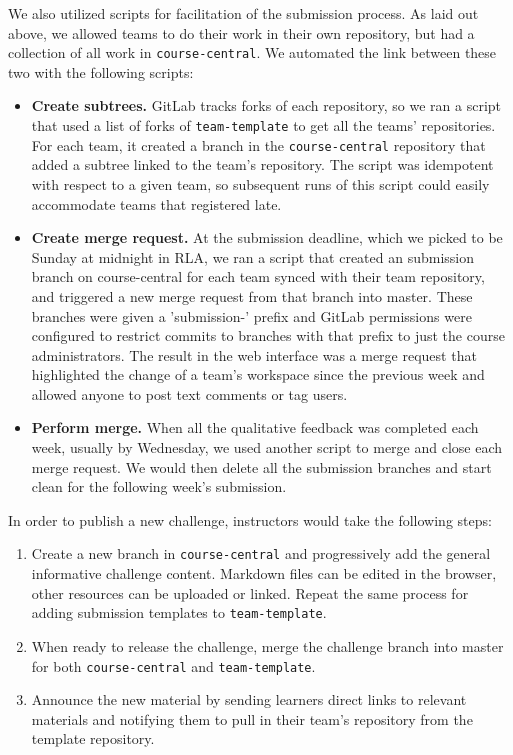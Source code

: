 \documentclass[12pt,twoside]{mitthesis}
\begin{document}
{We also utilized scripts for facilitation of the submission process. As laid out above, we allowed teams to do their work in their own repository, but had a collection of all work in \texttt{course-central}. We automated the link between these two with the following scripts:
\begin{itemize}
\item \textbf{Create subtrees.} GitLab tracks forks of each repository, so we ran a script that used a list of forks of \texttt{team-template} to get all the teams' repositories. For each team, it created a branch in the \texttt{course-central} repository that added a subtree linked to the team's repository. The script was idempotent with respect to a given team, so subsequent runs of this script could easily accommodate teams that registered late.
\item \textbf{Create merge request.} At the submission deadline, which we picked to be Sunday at midnight in RLA, we ran a script that created an submission branch on course-central for each team synced with their team repository, and triggered a new merge request from that branch into master. These branches were given a 'submission-' prefix and GitLab permissions were configured to restrict commits to branches with that prefix to just the course administrators. The result in the web interface was a merge request that highlighted the change of a team's workspace since the previous week and allowed anyone to post text comments or tag users.
\item \textbf{Perform merge.} When all the qualitative feedback was completed each week, usually by Wednesday, we used another script to merge and close each merge request. We would then delete all the submission branches and start clean for the following week's submission.
\end{itemize}

In order to publish a new challenge, instructors would take the following steps:
\begin{enumerate}
\item Create a new branch in \texttt{course-central} and progressively add the general informative challenge content. Markdown files can be edited in the browser, other resources can be uploaded or linked. Repeat the same process for adding submission templates to \texttt{team-template}.
\item When ready to release the challenge, merge the challenge branch into master for both \texttt{course-central} and \texttt{team-template}. 
\item Announce the new material by sending learners direct links to relevant materials and notifying them to pull in their team's repository from the template repository.
\end{enumerate}

}
\end{document}
